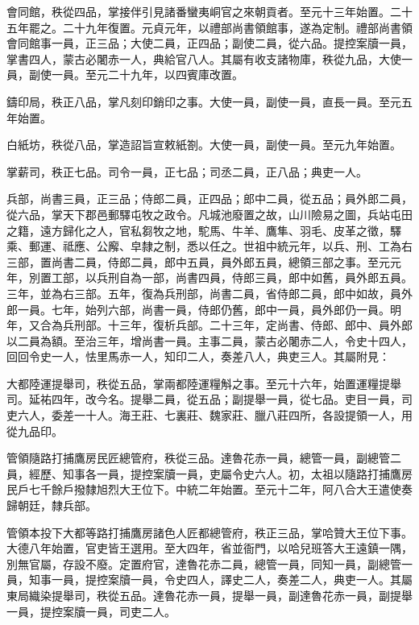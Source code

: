 \begin{pinyinscope}
 會同館，秩從四品，掌接伴引見諸番蠻夷峒官之來朝貢者。至元十三年始置。二十五年罷之。二十九年復置。元貞元年，以禮部尚書領館事，遂為定制。禮部尚書領會同館事一員，正三品；大使二員，正四品；副使二員，從六品。提控案牘一員，掌書四人，蒙古必闍赤一人，典給官八人。其屬有收支諸物庫，秩從九品，大使一員，副使一員。至元二十九年，以四賓庫改置。



 鑄印局，秩正八品，掌凡刻印銷印之事。大使一員，副使一員，直長一員。至元五年始置。



 白紙坊，秩從八品，掌造詔旨宣敕紙劄。大使一員，副使一員。至元九年始置。



 掌薪司，秩正七品。司令一員，正七品；司丞二員，正八品；典吏一人。



 兵部，尚書三員，正三品；侍郎二員，正四品；郎中二員，從五品；員外郎二員，從六品，掌天下郡邑郵驛屯牧之政令。凡城池廢置之故，山川險易之圖，兵站屯田之籍，遠方歸化之人，官私芻牧之地，駝馬、牛羊、鷹隼、羽毛、皮革之徵，驛乘、郵運、祗應、公廨、皁隸之制，悉以任之。世祖中統元年，以兵、刑、工為右三部，置尚書二員，侍郎二員，郎中五員，員外郎五員，總領三部之事。至元元年，別置工部，以兵刑自為一部，尚書四員，侍郎三員，郎中如舊，員外郎五員。三年，並為右三部。五年，復為兵刑部，尚書二員，省侍郎二員，郎中如故，員外郎一員。七年，始列六部，尚書一員，侍郎仍舊，郎中一員，員外郎仍一員。明年，又合為兵刑部。十三年，復析兵部。二十三年，定尚書、侍郎、郎中、員外郎以二員為額。至治三年，增尚書一員。主事二員，蒙古必闍赤二人，令史十四人，回回令史一人，怯里馬赤一人，知印二人，奏差八人，典吏三人。其屬附見：



 大都陸運提舉司，秩從五品，掌兩都陸運糧斛之事。至元十六年，始置運糧提舉司。延祐四年，改今名。提舉二員，從五品；副提舉一員，從七品。吏目一員，司吏六人，委差一十人。海王莊、七裏莊、魏家莊、臘八莊四所，各設提領一人，用從九品印。



 管領隨路打捕鷹房民匠總管府，秩從三品。達魯花赤一員，總管一員，副總管二員，經歷、知事各一員，提控案牘一員，吏屬令史六人。初，太祖以隨路打捕鷹房民戶七千餘戶撥隸旭烈大王位下。中統二年始置。至元十二年，阿八合大王遣使奏歸朝廷，隸兵部。



 管領本投下大都等路打捕鷹房諸色人匠都總管府，秩正三品，掌哈贊大王位下事。大德八年始置，官吏皆王選用。至大四年，省並衙門，以哈兒班答大王遠鎮一隅，別無官屬，存設不廢。定置府官，達魯花赤二員，總管一員，同知一員，副總管一員，知事一員，提控案牘一員，令史四人，譯史二人，奏差二人，典吏一人。其屬東局織染提舉司，秩從五品。達魯花赤一員，提舉一員，副達魯花赤一員，副提舉一員，提控案牘一員，司吏二人。




\end{pinyinscope}
